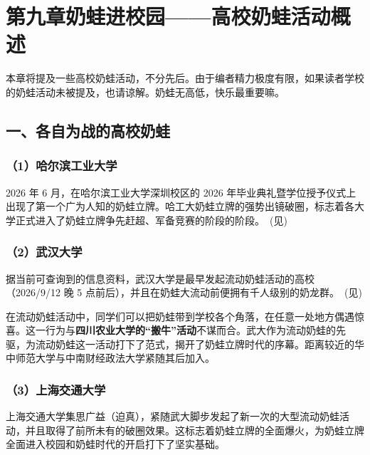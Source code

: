 
\clearpage
\section{第九章\quad 奶蛙进校园——高校奶蛙活动概述}

本章将提及一些高校奶蛙活动，不分先后。由于编者精力极度有限，如果读者学校的奶蛙活动未被提及，也请谅解。奶蛙无高低，快乐最重要嘛。

\subsection{一、各自为战的高校奶蛙}

\subsubsection{（1）哈尔滨工业大学}

2026 年 6 月，在哈尔滨工业大学深圳校区的 2026 年毕业典礼暨学位授予仪式上出现了第一个广为人知的奶蛙立牌。哈工大奶蛙立牌的强势出镜破圈，标志着各大学正式进入了奶蛙立牌争先赶超、军备竞赛的阶段的阶段。~(见)



\subsubsection{（2）武汉大学}

据当前可查询到的信息资料，武汉大学是最早发起流动奶蛙活动的高校（2026/9/12 晚 5 点前后），并且在奶蛙大流动前便拥有千人级别的奶龙群。~(见)



在流动奶蛙活动中，同学们可以把奶蛙带到学校各个角落，在任意一处地方偶遇惊喜。这一行为与\textbf{四川农业大学的“搬牛”活动}不谋而合。武大作为流动奶蛙的先驱，为流动奶蛙这一活动打下了范式，揭开了奶蛙立牌时代的序幕。距离较近的华中师范大学与中南财经政法大学紧随其后加入。

\subsubsection{（3）上海交通大学}

上海交通大学集思广益（迫真），紧随武大脚步发起了新一次的大型流动奶蛙活动，并且取得了前所未有的破圈效果。这标志着奶蛙立牌的全面爆火，为奶蛙立牌全面进入校园和奶蛙时代的开启打下了坚实基础。

